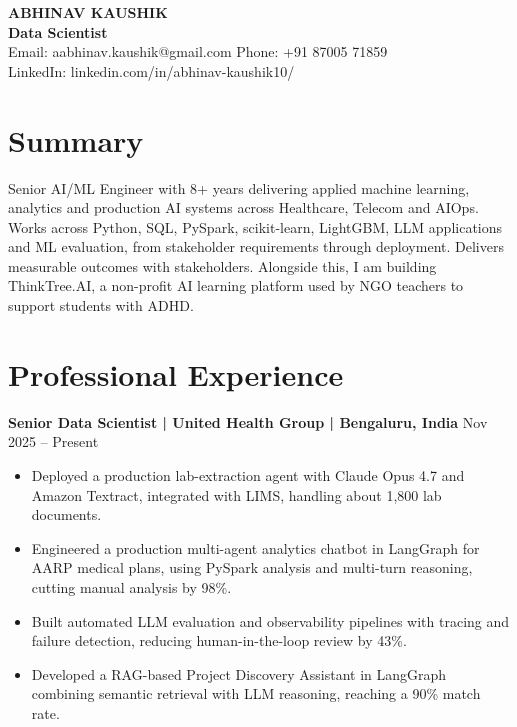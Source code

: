 \documentclass[10pt,a4paper]{article}
\newcommand{\role}[2]{\textbf{#1} \hfill #2\par}
\begin{document}
\begin{center}
  {\Large\bfseries ABHINAV KAUSHIK}\\[1pt]
  \textbf{Data Scientist}\\[1pt]
  Email: aabhinav.kaushik@gmail.com \quad Phone: +91 87005 71859\\
  LinkedIn: linkedin.com/in/abhinav-kaushik10/
\end{center}

\section{Summary}
Senior AI/ML Engineer with 8+ years delivering applied machine learning, analytics and production AI systems across Healthcare, Telecom and AIOps. Works across Python, SQL, PySpark, scikit-learn, LightGBM, LLM applications and ML evaluation, from stakeholder requirements through deployment. Delivers measurable outcomes with stakeholders. Alongside this, I am building ThinkTree.AI, a non-profit AI learning platform used by NGO teachers to support students with ADHD.

\section{Professional Experience}
\role{Senior Data Scientist | United Health Group | Bengaluru, India}{Nov 2025 -- Present}
\begin{itemize}
  \item Deployed a production lab-extraction agent with Claude Opus 4.7 and Amazon Textract, integrated with LIMS, handling about 1,800 lab documents.
  \item Engineered a production multi-agent analytics chatbot in LangGraph for AARP medical plans, using PySpark analysis and multi-turn reasoning, cutting manual analysis by 98\%.
  \item Built automated LLM evaluation and observability pipelines with tracing and failure detection, reducing human-in-the-loop review by 43\%.
  \item Developed a RAG-based Project Discovery Assistant in LangGraph combining semantic retrieval with LLM reasoning, reaching a 90\% match rate.
\end{itemize}
\vspace{3pt}
\end{document}
